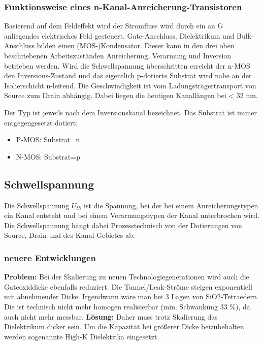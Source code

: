 	\subsubsection{Funktionsweise eines n-Kanal-Anreicherung-Transistoren}	
	Basierend auf dem Feldeffekt wird der Stromfluss wird durch ein an G anliegendes	elektrisches Feld gesteuert.
	\newline
	Gate-Anschluss, Dielektrikum und Bulk-Anschluss bilden einen (MOS-)Kondensator.
	Dieser kann in den drei oben beschriebenen Arbeitszuständen	Anreicherung, Verarmung und Inversion betrieben werden.
	Wird die Schwellspannung überschritten erreicht der n-MOS den Inversions-Zustand und das eigentlich p-dotierte Substrat wird nahe an der Isolierschicht n-leitend.
	\newline
	Die Geschwindigkeit ist vom Ladungsträgertransport von Source zum Drain abhängig. Dabei liegen die heutigen Kanallängen bei < 32 nm.
	\newline
	
	Der Typ ist jeweils nach dem Inversionskanal bezeichnet. Das Substrat ist immer entgegengesetzt dotiert:		
	\begin{itemize}
		\item P-MOS: Substrat=n
		\item N-MOS: Substrat=p
	\end{itemize}

	\subsection{Schwellspannung}
		Die Schwellspannung $U_{th}$ ist die Spannung, bei der bei einem Anreicherungstypen ein Kanal entsteht und bei einem Verarmungstypen der Kanal unterbrochen wird. 
		Die Schwellspannung hängt dabei Prozesstechnisch von der Dotierungen von Source, Drain und des Kanal-Gebietes ab.
	\subsubsection{neuere Entwicklungen}
		\textbf{Problem: }
		\newline
		Bei der Skalierung zu neuen Technologiegenerationen wird auch die Gateoxiddicke ebenfalls reduziert. 
		Die Tunnel/Leak-Ströme steigen exponentiell mit abnehmender Dicke.
		Irgendwann wäre man bei 3 Lagen von SiO2-Tetraedern. Die ist technisch nicht mehr homogen realisierbar (min. Schwankung 33 \%), da auch nicht mehr messbar. 
		\newline
		\textbf{Lösung: }
		\newline
		Daher muss trotz Skalierung das Dielektrikum dicker sein. Um die Kapazität bei größerer Dicke beizubehalten werden sogenannte High-K Dielektrika eingesetzt. 
		
